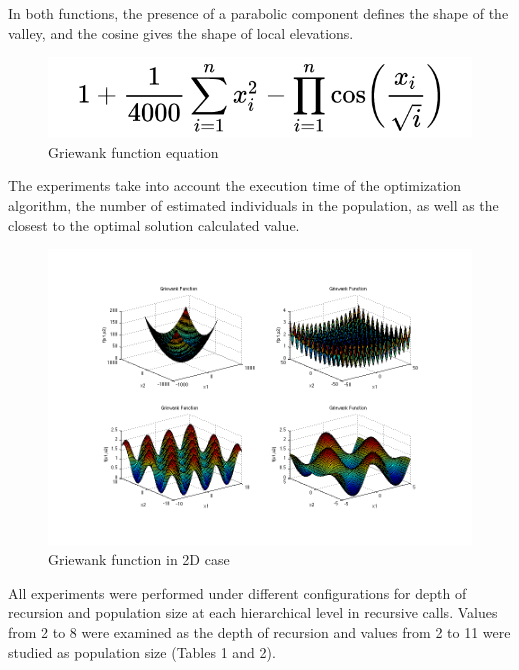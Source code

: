 \documentclass[graybox]{styles/svmult}
\begin{document}
In both functions, the presence of a parabolic component defines the shape of the valley, and the cosine gives the shape of local elevations.

\begin{figure}[b]
\sidecaption
\includegraphics[width=1.0\textwidth]{images/fig02a}
\caption{Griewank function equation}
\label{fig:6}
\end{figure}

The experiments take into account the execution time of the optimization algorithm, the number of estimated individuals in the population, as well as the closest to the optimal solution calculated value.

\begin{figure}[b]
\sidecaption
\includegraphics[width=1.0\textwidth]{images/fig02b}
\caption{Griewank function in 2D case}
\label{fig:7}
\end{figure}

All experiments were performed under different configurations for depth of recursion and population size at each hierarchical level in recursive calls. Values from 2 to 8 were examined as the depth of recursion and values from 2 to 11 were studied as population size (Tables 1 and 2).
\end{document}

